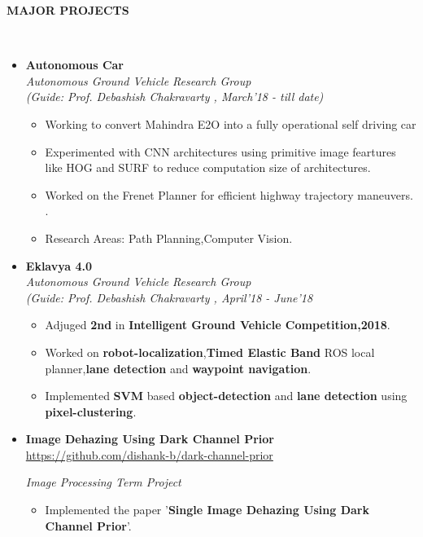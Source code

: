 \documentclass[a4paper,10pt]{article}
\newcommand{\isep}{-2 pt}
\newcommand{\lsep}{-0.5cm}
\newcommand{\resheading}[1]{{\small \colorbox{mygrey}{\begin{minipage}{0.975\textwidth}{\textbf{#1 \vphantom{p\^{E}}}}\end{minipage}}}}
\begin{document}
\resheading{\textbf{MAJOR PROJECTS} }\\[\lsep]

\begin{itemize}
\item \textbf{Autonomous Car} \hspace{0.5cm} \\ 
\emph{Autonomous Ground Vehicle Research Group}\\
 \emph{(Guide: Prof. Debashish Chakravarty																							
, March'18 - till date)} \\[-0.6cm]
	\begin{itemize}\itemsep \isep
	\item Working to convert Mahindra E2O into a fully operational self driving car
	\item Experimented with CNN architectures using primitive image feartures like HOG and SURF to reduce computation size of architectures.
	\item Worked on the Frenet Planner for efficient highway trajectory maneuvers.
.
	\item Research Areas: Path Planning,Computer Vision.
	\end{itemize} 

\item \textbf{Eklavya 4.0} \\ 
\emph{Autonomous Ground Vehicle Research Group} \hspace{0.5cm}
{}\\
 \emph{(Guide: Prof. Debashish Chakravarty																							
, April'18 - June'18} \\[-0.6cm]
	\begin{itemize}\itemsep \isep
	\item Adjuged \textbf{2nd} in \textbf{Intelligent Ground Vehicle Competition,2018}.
	\item Worked on \textbf{robot-localization},\textbf{Timed Elastic Band} ROS local planner,\textbf{lane detection} and \textbf{waypoint navigation}.
	\item Implemented \textbf{SVM} based \textbf{object-detection} and \textbf{lane detection} using \textbf{pixel-clustering}.
	\end{itemize} 

\item \textbf{Image Dehazing Using Dark Channel Prior} \hspace{0.5cm} \url{https://github.com/dishank-b/dark-channel-prior}

	\emph{Image Processing Term Project}
	\begin{itemize}\itemsep \isep
	\item Implemented the paper '\textbf{Single Image Dehazing Using Dark Channel Prior}'.
	

\end{itemize}
\end{itemize}
\end{document}
